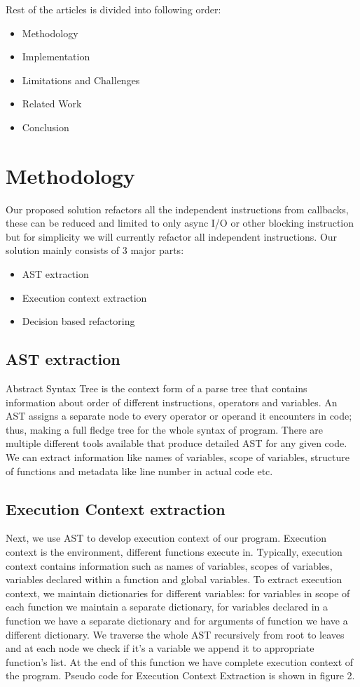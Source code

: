 \documentclass[10pt,conference]{IEEEtran}
\begin{document}
Rest of the articles is divided into following order:
\begin{itemize}
	\item Methodology
	\item Implementation
	\item Limitations and Challenges
	\item Related Work
	\item Conclusion

\end{itemize}

\section{Methodology}
Our proposed solution refactors all the independent instructions from callbacks, these can be reduced and limited to only async I/O or other blocking instruction but for simplicity we will currently refactor all independent instructions. Our solution mainly consists of 3 major parts:
\begin{itemize}
	\item AST extraction
	\item Execution context extraction
	\item Decision based refactoring
\end{itemize}
\subsection{AST extraction}
Abstract Syntax Tree is the context form of a parse tree that contains information about order of different instructions, operators and variables. An AST assigns a separate node to every operator or operand it encounters in code; thus, making a full fledge tree for the whole syntax of program. There are multiple different tools available that produce detailed AST for any given code. We can extract information like names of variables, scope of variables, structure of functions and metadata like line number in actual code etc. 
\subsection{Execution Context extraction}
Next, we use AST to develop execution context of our program. Execution context is the environment, different functions execute in. Typically, execution context contains information such as names of variables, scopes of variables, variables declared within a function and global variables. To extract execution context, we maintain dictionaries for different variables: for variables in scope of each function we maintain a separate dictionary, for variables declared in a function we have a separate dictionary and for arguments of function we have a different dictionary. We traverse the whole AST recursively from root to leaves and at each node we check if it’s a variable we append it to appropriate function’s list. At the end of this function we have complete execution context of the program. Pseudo code for Execution Context Extraction is shown in figure 2.
\end{document}
